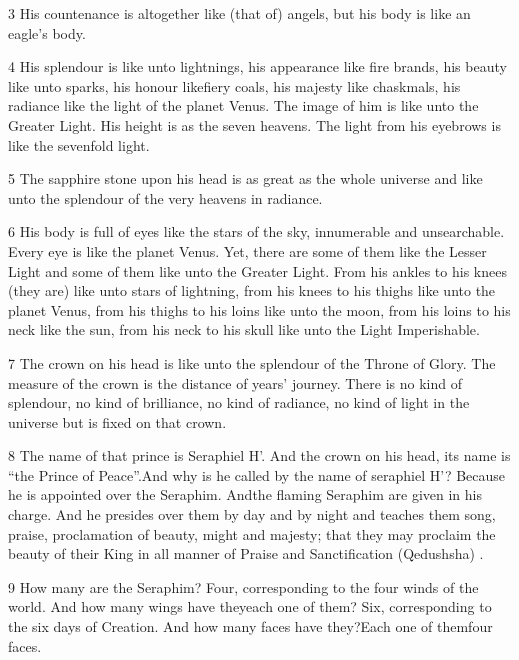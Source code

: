 \par 3 His countenance is altogether like (that of) angels, but his body is like an eagle's body. 

\par 4 His splendour is like unto lightnings, his appearance like fire brands, his beauty like unto sparks, his honour likefiery coals, his majesty like chaskmals, his radiance like the light of the planet Venus. The image of him is like unto the Greater Light. His height is as the seven heavens. The light from his eyebrows is like the sevenfold light. 

\par 5 The sapphire stone upon his head is as great as the whole universe and like unto the splendour of the very heavens in radiance. 

\par 6 His body is full of eyes like the stars of the sky, innumerable and unsearchable. Every eye is like the planet Venus. Yet, there are some of them like the Lesser Light and some of them like unto the Greater Light. From his ankles to his knees (they are) like unto stars of lightning, from his knees to his thighs like unto the planet Venus, from his thighs to his loins like unto the moon, from his loins to his neck like the sun, from his neck to his skull like unto the Light Imperishable.

\par 7 The crown on his head is like unto the splendour of the Throne of Glory. The measure of the crown is the distance of years' journey. There is no kind of splendour, no kind of brilliance, no kind of radiance, no kind of light in the universe but is fixed on that crown. 

\par 8 The name of that prince is Seraphiel H'. And the crown on his head, its name is “the Prince of Peace”.And why is he called by the name of seraphiel H'? Because he is appointed over the Seraphim. Andthe flaming Seraphim are given in his charge. And he presides over them by day and by night and teaches them song, praise, proclamation of beauty, might and majesty; that they may proclaim the beauty of their King in all manner of Praise and Sanctification (Qedushsha) . 

\par 9 How many are the Seraphim? Four, corresponding to the four winds of the world. And how many wings have theyeach one of them? Six, corresponding to the six days of Creation. And how many faces have they?Each one of themfour faces.


